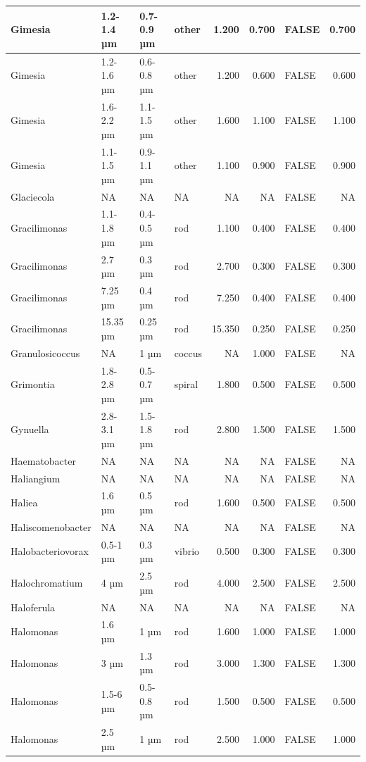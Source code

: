 \documentclass[
]{article}
\begin{document}
\begin{table}
\begin{tabular}{l|l|l|l|r|r|l|r}
\hline
Gimesia & 1.2-1.4 µm & 0.7-0.9 µm & other & 1.200 & 0.700 & FALSE & 0.700\\
\hline
Gimesia & 1.2-1.6 µm & 0.6-0.8 µm & other & 1.200 & 0.600 & FALSE & 0.600\\
\hline
Gimesia & 1.6-2.2 µm & 1.1-1.5 µm & other & 1.600 & 1.100 & FALSE & 1.100\\
\hline
Gimesia & 1.1-1.5 µm & 0.9-1.1 µm & other & 1.100 & 0.900 & FALSE & 0.900\\
\hline
Glaciecola & NA & NA & NA & NA & NA & FALSE & NA\\
\hline
Gracilimonas & 1.1-1.8 µm & 0.4-0.5 µm & rod & 1.100 & 0.400 & FALSE & 0.400\\
\hline
Gracilimonas & 2.7 µm & 0.3 µm & rod & 2.700 & 0.300 & FALSE & 0.300\\
\hline
Gracilimonas & 7.25 µm & 0.4 µm & rod & 7.250 & 0.400 & FALSE & 0.400\\
\hline
Gracilimonas & 15.35 µm & 0.25 µm & rod & 15.350 & 0.250 & FALSE & 0.250\\
\hline
Granulosicoccus & NA & 1 µm & coccus & NA & 1.000 & FALSE & NA\\
\hline
Grimontia & 1.8-2.8 µm & 0.5-0.7 µm & spiral & 1.800 & 0.500 & FALSE & 0.500\\
\hline
Gynuella & 2.8-3.1 µm & 1.5-1.8 µm & rod & 2.800 & 1.500 & FALSE & 1.500\\
\hline
Haematobacter & NA & NA & NA & NA & NA & FALSE & NA\\
\hline
Haliangium & NA & NA & NA & NA & NA & FALSE & NA\\
\hline
Haliea & 1.6 µm & 0.5 µm & rod & 1.600 & 0.500 & FALSE & 0.500\\
\hline
Haliscomenobacter & NA & NA & NA & NA & NA & FALSE & NA\\
\hline
Halobacteriovorax & 0.5-1 µm & 0.3 µm & vibrio & 0.500 & 0.300 & FALSE & 0.300\\
\hline
Halochromatium & 4 µm & 2.5 µm & rod & 4.000 & 2.500 & FALSE & 2.500\\
\hline
Haloferula & NA & NA & NA & NA & NA & FALSE & NA\\
\hline
Halomonas & 1.6 µm & 1 µm & rod & 1.600 & 1.000 & FALSE & 1.000\\
\hline
Halomonas & 3 µm & 1.3 µm & rod & 3.000 & 1.300 & FALSE & 1.300\\
\hline
Halomonas & 1.5-6 µm & 0.5-0.8 µm & rod & 1.500 & 0.500 & FALSE & 0.500\\
\hline
Halomonas & 2.5 µm & 1 µm & rod & 2.500 & 1.000 & FALSE & 1.000\\

\end{tabular}
\end{table}
\end{document}
